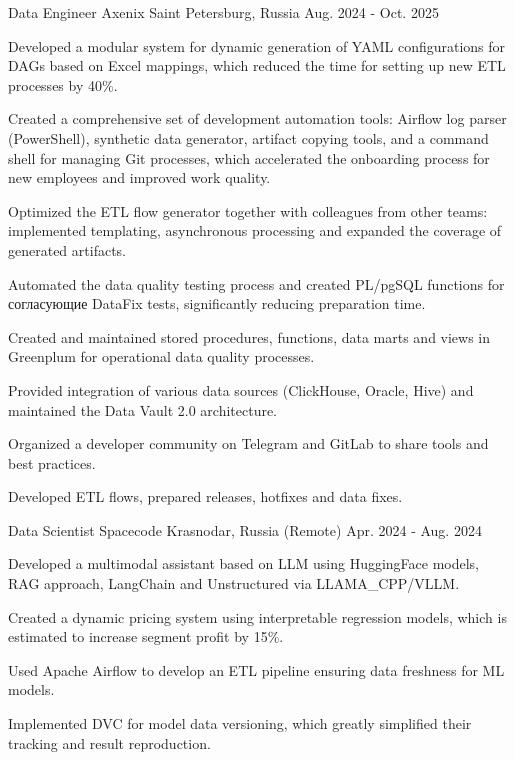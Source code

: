 \begin{cventries}
  \cventry
    {Data Engineer} %
    {Axenix} %
    {Saint Petersburg, Russia} %
    {Aug. 2024 - Oct. 2025} %
    {
      \begin{cvitems} %
        \item {Developed a modular system for dynamic generation of YAML configurations for DAGs based on Excel mappings, which reduced the time for setting up new ETL processes by 40\%.}
        \item {Created a comprehensive set of development automation tools: Airflow log parser (PowerShell), synthetic data generator, artifact copying tools, and a command shell for managing Git processes, which accelerated the onboarding process for new employees and improved work quality.}
        \item {Optimized the ETL flow generator together with colleagues from other teams: implemented templating, asynchronous processing and expanded the coverage of generated artifacts.}
        \item {Automated the data quality testing process and created PL/pgSQL functions for согласующие DataFix tests, significantly reducing preparation time.}
        \item {Created and maintained stored procedures, functions, data marts and views in Greenplum for operational data quality processes.}
        \item {Provided integration of various data sources (ClickHouse, Oracle, Hive) and maintained the Data Vault 2.0 architecture.}
        \item {Organized a developer community on Telegram and GitLab to share tools and best practices.}
        \item {Developed ETL flows, prepared releases, hotfixes and data fixes.}
      \end{cvitems}
    }

  \cventry
    {Data Scientist} %
    {Spacecode} %
    {Krasnodar, Russia (Remote)} %
    {Apr. 2024 - Aug. 2024} %
    {
      \begin{cvitems} %
        \item {Developed a multimodal assistant based on LLM using HuggingFace models, RAG approach, LangChain and Unstructured via LLAMA\_CPP/VLLM.}
        \item {Created a dynamic pricing system using interpretable regression models, which is estimated to increase segment profit by 15\%.}
        \item {Used Apache Airflow to develop an ETL pipeline ensuring data freshness for ML models.}
        \item {Implemented DVC for model data versioning, which greatly simplified their tracking and result reproduction.}
      \end{cvitems}
    }


\end{cventries}
